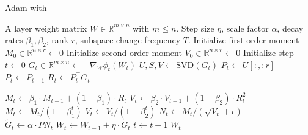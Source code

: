 
\newlength\myindent
\setlength\myindent{2em}
\newcommand\bindent{%
  \begingroup
  \setlength{\itemindent}{\myindent}
  \addtolength{\algorithmicindent}{\myindent}
}
\newcommand\eindent{\endgroup}



\begin{algorithm}[tb]
   \caption{Adam with \lowrank}
   \label{alg:low_rank_adam}
 \begin{algorithmic}
    A layer weight matrix $W \in \mathbb{R}^{m \times n}$ with $m \leq n$. Step size $\eta$, scale factor $\alpha$, decay rates $\beta_1, \beta_2$, rank $r$, subspace change frequency $T$.
   \STATE Initialize first-order moment $M_0 \in \mathbb{R}^{n \times r} \gets 0$
   \STATE Initialize second-order moment $V_0 \in \mathbb{R}^{n \times r} \gets 0$
   \STATE Initialize step $t \gets 0$
   \REPEAT
   \STATE $G_t \in \mathbb{R}^{m \times n} \gets - \nabla_W \phi_t(W_t)$ 
   \STATE $U, S, V \gets \text{SVD}(G_t)$
   \STATE $P_t \gets U[:, :r]$ \hfill {}
   \ELSE
   \STATE $P_t \gets P_{t-1}$ \hfill {}
   \ENDIF
   \STATE $R_t \gets P_{t}^{\top} G_t$ \hfill {}
   \\\hrulefill
   \bindent
   \hspace{\algorithmicindent} \STATE $M_t \gets \beta_1 \cdot M_{t-1} + (1 - \beta_1) \cdot R_t$ 
   \hspace{\algorithmicindent} \STATE $V_t \gets \beta_2 \cdot V_{t-1} + (1 - \beta_2) \cdot R_t^2$ 
   \hspace{\algorithmicindent} \STATE $M_t \gets M_t / (1 - \beta_1^t)$
   \hspace{\algorithmicindent} \STATE $V_t \gets V_t / (1 - \beta_2^t)$ 
   \hspace{\algorithmicindent} \STATE $N_t \gets M_t / (\sqrt{V_t} + \epsilon)$
   \eindent
   \\\hrulefill
   \STATE $\tilde G_t \gets \alpha \cdot P N_t$ \hfill {}
   \STATE $W_t \gets W_{t-1} + \eta \cdot \tilde G_t$
   \STATE $t \gets t + 1$
   \RETURN $W_t$
 \end{algorithmic}
\end{algorithm}
